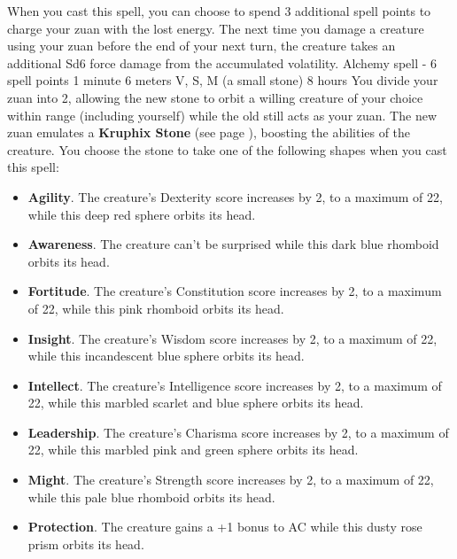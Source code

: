         When you cast this spell, you can choose to spend 3 additional spell points to charge your zuan with the lost energy.
        The next time you damage a creature using your zuan before the end of your next turn, the creature takes an additional Sd6 force damage from the accumulated volatility.
        {Alchemy spell - 6 spell points}
        {1 minute}
        {6 meters}
        {V, S, M (a small stone)}
        {8 hours}
        You divide your zuan into 2, allowing the new stone to orbit a willing creature of your choice within range (including yourself) while the old still acts as your zuan.
        The new zuan emulates a \textbf{Kruphix Stone} (see page \pageref{item::kruphixstone}), boosting the abilities of the creature.
        You choose the stone to take one of the following shapes when you cast this spell:
        \begin{itemize}
            \item \textbf{Agility}.
            The creature's Dexterity score increases by 2, to a maximum of 22, while this deep red sphere orbits its head.
            \item \textbf{Awareness}.
            The creature can't be surprised while this dark blue rhomboid orbits its head.
            \item \textbf{Fortitude}.
            The creature's Constitution score increases by 2, to a maximum of 22, while this pink rhomboid orbits its head.
            \item \textbf{Insight}.
            The creature's Wisdom score increases by 2, to a maximum of 22, while this incandescent blue sphere orbits its head.
            \item \textbf{Intellect}.
            The creature's Intelligence score increases by 2, to a maximum of 22, while this marbled scarlet and blue sphere orbits its head.
            \item \textbf{Leadership}.
            The creature's Charisma score increases by 2, to a maximum of 22, while this marbled pink and green sphere orbits its head.
            \item \textbf{Might}.
            The creature's Strength score increases by 2, to a maximum of 22, while this pale blue rhomboid orbits its head.
            \item \textbf{Protection}.
            The creature gains a +1 bonus to AC while this dusty rose prism orbits its head.
        \end{itemize}

